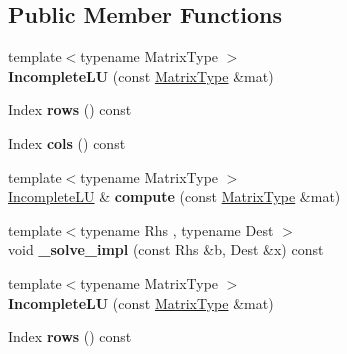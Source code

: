 \subsection*{Public Member Functions}
\begin{DoxyCompactItemize}
\item 
\mbox{\label{class_eigen_1_1_incomplete_l_u_a463a286c9dfa26ede12bb60168be5bfd}} 
{\footnotesize template$<$typename Matrix\+Type $>$ }\\{\bfseries Incomplete\+LU} (const \hyperlink{group___core___module}{Matrix\+Type} \&mat)
\item 
\mbox{\label{class_eigen_1_1_incomplete_l_u_a74e2598dee1ce1c2adbbc7ca6c2aabad}} 
Index {\bfseries rows} () const
\item 
\mbox{\label{class_eigen_1_1_incomplete_l_u_a976a4a54494f793c67d95513bd55d941}} 
Index {\bfseries cols} () const
\item 
\mbox{\label{class_eigen_1_1_incomplete_l_u_aa5af1411dde3ca1d290ac229c04d3d46}} 
{\footnotesize template$<$typename Matrix\+Type $>$ }\\\hyperlink{class_eigen_1_1_incomplete_l_u}{Incomplete\+LU} \& {\bfseries compute} (const \hyperlink{group___core___module}{Matrix\+Type} \&mat)
\item 
\mbox{\label{class_eigen_1_1_incomplete_l_u_aa4ecefd8c9ee6400122451596b4cb9ec}} 
{\footnotesize template$<$typename Rhs , typename Dest $>$ }\\void {\bfseries \+\_\+solve\+\_\+impl} (const Rhs \&b, Dest \&x) const
\item 
\mbox{\label{class_eigen_1_1_incomplete_l_u_a463a286c9dfa26ede12bb60168be5bfd}} 
{\footnotesize template$<$typename Matrix\+Type $>$ }\\{\bfseries Incomplete\+LU} (const \hyperlink{group___core___module}{Matrix\+Type} \&mat)
\item 
\mbox{\label{class_eigen_1_1_incomplete_l_u_a74e2598dee1ce1c2adbbc7ca6c2aabad}} 
Index {\bfseries rows} () const
\item 

\end{DoxyCompactItemize}
